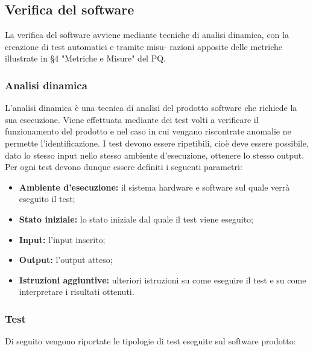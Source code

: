 \documentclass[../NormediProgetto.tex]{subfiles}
\begin{document}
\subsection{Verifica del software}

La verifica del software avviene mediante tecniche di analisi dinamica, con la creazione di test automatici e tramite misu-
razioni apposite delle metriche illustrate in §4 "Metriche e Misure" del PQ.

\subsubsection{Analisi dinamica}

L’analisi dinamica è una tecnica di analisi del prodotto software che richiede la sua esecuzione. Viene effettuata mediante dei test volti a verificare il funzionamento del prodotto e nel caso in cui vengano riscontrate anomalie ne permette l’identificazione. I test devono essere ripetibili, cioè deve essere possibile, dato lo stesso input nello stesso ambiente d'esecuzione, ottenere lo stesso output. Per ogni test devono dunque essere definiti i seguenti parametri:

\begin{itemize}
    \item \textbf{Ambiente d'esecuzione:} il sistema hardware e software sul quale verrà eseguito il test;
    \item \textbf{Stato iniziale:} lo stato iniziale dal quale il test viene eseguito;
    \item \textbf{Input:} l’input inserito;
    \item \textbf{Output:} l’output atteso;
    \item \textbf{Istruzioni aggiuntive:} ulteriori istruzioni su come eseguire il test e su come interpretare i risultati ottenuti.
\end{itemize}

\subsubsection{Test}

Di seguito vengono riportate le tipologie di test eseguite sul software prodotto:
\end{document}
